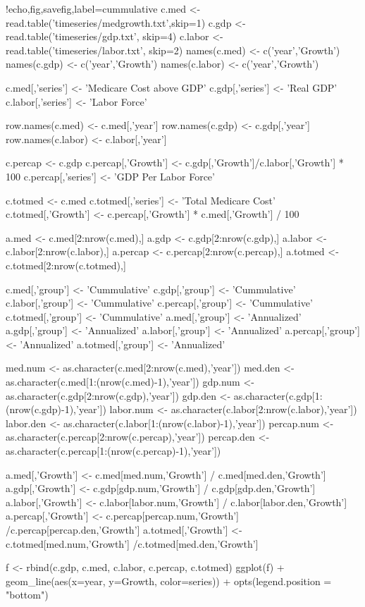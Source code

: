 \documentclass{article}
\begin{document}
\begin{Rcode}{!echo,fig,savefig,label=cummulative}
c.med <- read.table('timeseries/medgrowth.txt',skip=1)
c.gdp <- read.table('timeseries/gdp.txt', skip=4)
c.labor <- read.table('timeseries/labor.txt', skip=2)
names(c.med) <- c('year','Growth')
names(c.gdp) <- c('year','Growth')
names(c.labor) <- c('year','Growth')

c.med[,'series'] <- 'Medicare Cost above GDP'
c.gdp[,'series'] <- 'Real GDP'
c.labor[,'series'] <- 'Labor Force'

row.names(c.med) <- c.med[,'year']
row.names(c.gdp) <- c.gdp[,'year']
row.names(c.labor) <- c.labor[,'year']

c.percap <- c.gdp
c.percap[,'Growth'] <- c.gdp[,'Growth']/c.labor[,'Growth'] * 100
c.percap[,'series'] <- 'GDP Per Labor Force'

c.totmed <- c.med
c.totmed[,'series'] <- 'Total Medicare Cost'
c.totmed[,'Growth'] <- c.percap[,'Growth'] * c.med[,'Growth'] / 100

a.med <- c.med[2:nrow(c.med),]
a.gdp <- c.gdp[2:nrow(c.gdp),]
a.labor <- c.labor[2:nrow(c.labor),]
a.percap <- c.percap[2:nrow(c.percap),]
a.totmed <- c.totmed[2:nrow(c.totmed),]

c.med[,'group'] <- 'Cummulative'
c.gdp[,'group'] <- 'Cummulative'
c.labor[,'group'] <- 'Cummulative'
c.percap[,'group'] <- 'Cummulative'
c.totmed[,'group'] <- 'Cummulative'
a.med[,'group'] <- 'Annualized'
a.gdp[,'group'] <- 'Annualized'
a.labor[,'group'] <- 'Annualized'
a.percap[,'group'] <- 'Annualized'
a.totmed[,'group'] <- 'Annualized'

med.num <- as.character(c.med[2:nrow(c.med),'year'])
med.den <- as.character(c.med[1:(nrow(c.med)-1),'year'])
gdp.num <- as.character(c.gdp[2:nrow(c.gdp),'year'])
gdp.den <- as.character(c.gdp[1:(nrow(c.gdp)-1),'year'])
labor.num <- as.character(c.labor[2:nrow(c.labor),'year'])
labor.den <- as.character(c.labor[1:(nrow(c.labor)-1),'year'])
percap.num <- as.character(c.percap[2:nrow(c.percap),'year'])
percap.den <- as.character(c.percap[1:(nrow(c.percap)-1),'year'])

a.med[,'Growth'] <- c.med[med.num,'Growth'] / c.med[med.den,'Growth']
a.gdp[,'Growth'] <- c.gdp[gdp.num,'Growth'] / c.gdp[gdp.den,'Growth']
a.labor[,'Growth'] <- c.labor[labor.num,'Growth'] / c.labor[labor.den,'Growth']
a.percap[,'Growth'] <- c.percap[percap.num,'Growth'] /c.percap[percap.den,'Growth']
a.totmed[,'Growth'] <- c.totmed[med.num,'Growth'] /c.totmed[med.den,'Growth']

f <- rbind(c.gdp, c.med, c.labor, c.percap, c.totmed)
ggplot(f) + geom_line(aes(x=year, y=Growth, color=series)) + opts(legend.position = "bottom")
\end{Rcode}
\end{document}

